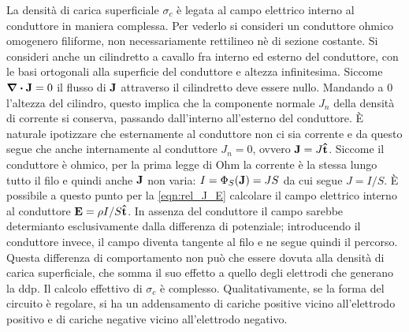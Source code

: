 La densità di carica superficiale $\sigma_c$ è legata al campo elettrico interno al conduttore in
maniera complessa. Per vederlo si consideri un conduttore ohmico omogenero filiforme, non necessariamente
rettilineo nè di sezione costante. Si consideri anche un cilindretto a cavallo fra interno ed esterno del
conduttore, con le basi ortogonali alla superficie del conduttore e altezza infinitesima. Siccome
$\div{\vb{J}}=0$ il flusso di $\vb{J}$ attraverso il cilindretto deve essere nullo. Mandando a $0$ l'altezza
del cilindro, questo implica che la componente normale $J_n$ della densità di corrente si conserva, passando
dall'interno all'esterno del conduttore. È naturale ipotizzare che esternamente al conduttore non ci sia corrente
e da questo segue che anche internamente al conduttore $J_n=0$, ovvero $\vb{J}=J\vu{t}$.
Siccome il conduttore è ohmico, per la prima legge di Ohm la corrente è la stessa lungo tutto il filo e quindi
anche $\vb{J}$ non varia: $I=\Phi_S(\vb{J})=JS$ da cui segue $J=I/S$.
È possibile a questo punto per la \eqref{eqn:rel_J_E} calcolare il campo elettrico interno al conduttore
$\vb{E}=\rho I/S \vu{t}$. In assenza del conduttore il campo sarebbe determianto esclusivamente dalla
differenza di potenziale; introducendo il conduttore invece, il campo diventa tangente al filo e ne
segue quindi il percorso. Questa differenza di comportamento non può che essere dovuta alla
densità di carica superficiale, che somma il suo effetto a quello degli elettrodi che generano la ddp.
Il calcolo effettivo di $\sigma_c$ è complesso. Qualitativamente, se la forma del circuito è regolare,
si ha un addensamento di cariche positive vicino all'elettrodo positivo e di cariche negative vicino
all'elettrodo negativo.
